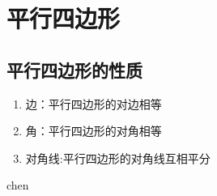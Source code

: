 \chapter{平行四边形}
\section{平行四边形的性质}
\begin{enumerate}
	\item 边：平行四边形的对边相等
	\item 角：平行四边形的对角相等
	\item 对角线:平行四边形的对角线互相平分
\end{enumerate}
chen